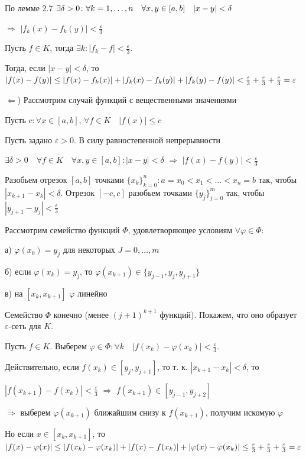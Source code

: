 \documentclass[a4paper]{report}
\newcommand*{\hm}[1]{#1\nobreak\discretionary{}%
            {\hbox{$\mathsurround=0pt #1$}}{}}
\begin{document}
По лемме 2.7 $\exists\delta>0\colon\forall k\hm=1,\ldots,n\quad\forall x,y\in[a,b]\quad|x-y|<\delta$ 

$\Rightarrow$ 
$|f_k(x)-f_k(y)|<\frac\varepsilon3$

Пусть $f\in K$, тогда $\exists k\colon|f_k-f|<\frac\varepsilon3$. 

Тогда, если $|x-y|<\delta$, то $|f(x)\hm-f(y)|\le|f(x)-f_k(x)|+|f_k(x)-f_k(y)|\hm+|f_k(y)-f(y)|<\frac\varepsilon3+
\frac\varepsilon3+\frac\varepsilon3=\varepsilon$ 

$\Leftarrow$) Рассмотрим случай функций с вещественными значениями

 \noindent Пусть $c\colon\forall x\in[a,b]$, $\forall f\in K\quad |f(x)|\le c$

 Пусть задано $\varepsilon>0$. В силу равностепенной непрерывности 
 
 $\exists\delta>0\quad\forall f\in K\quad
\forall x,y\in[a,b]\colon|x-y|<\delta$ $\Rightarrow$ $|f(x)-f(y)|<\frac\varepsilon3$


Разобьем отрезок $[a,b]$ точками $\{x_k\}_{k=0}^n\colon a=x_0<x_1<\ldots<x_n=b$ так, чтобы $|x_{k+1}-x_k|<\delta$. Отрезок 
$[-c,c]$ разобьем точками $\{y_j\}_{j=0}^m$ так, чтобы $|y_{j+1}-y_j|<\frac\varepsilon3$

Рассмотрим семейство функций $\Phi$, удовлетворяющее условиям $\forall\varphi\in\Phi$:

а) $\varphi(x_0)=y_j$ для некоторых $J=0,\ldots,m$

б) если $\varphi(x_k)=y_j$, то $\varphi(x_{k+1})\in\{y_{j-1},y_j,y_{j+1}\}$

в) на $[x_k,x_{k+1}]$ $\varphi$ линейно

Семейство $\Phi$ конечно (менее $(j+1)^{k+1}$ функций). Покажем, что оно образует $\varepsilon$-сеть для $K$.

Пусть $f\in K$. Выберем $\varphi\in\Phi\colon\forall k\quad|f(x_k)-\varphi(x_k)|<\frac\varepsilon3$. 

Действительно, если $f(x_k)\in[y_j,y_{j+1}]$, то т. к. $|x_{k+1}-x_k|<\delta$, то 

$|f(x_{k+1})-f(x_k)|<\frac\varepsilon3$ $\Rightarrow$ $f(x_{k+1})\in[y_{j-1},y_{j+2}]$

$\Rightarrow$ выберем $\varphi(x_{k+1})$ ближайшим снизу к $f(x_{k+1})$, получим искомую $\varphi$

Но если $x\in[x_k,x_{k+1}]$, то $|f(x)-\varphi(x)|\le|f(x_k)-\varphi(x_k)|+|f(x)-f(x_k)|\hm+|\varphi(x)-\varphi(x_k)|\le
\frac\varepsilon3+\frac\varepsilon3+\frac\varepsilon3=\varepsilon$
\end{document}
